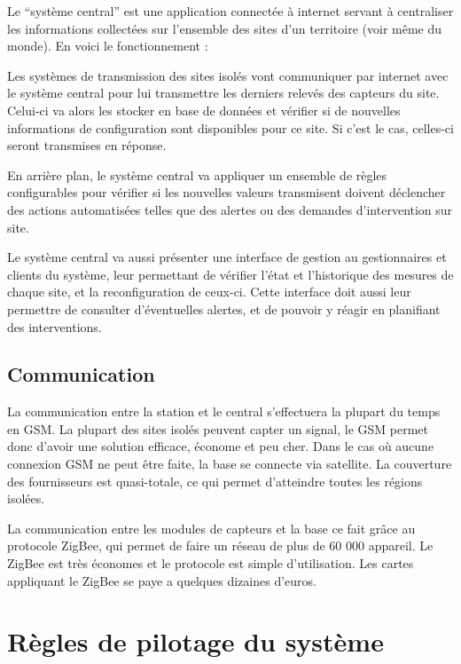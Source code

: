 Le ``système central'' est une application connectée à internet servant à centraliser les informations collectées sur l'ensemble des sites d'un territoire (voir même du monde). En voici le fonctionnement :

Les systèmes de transmission des sites isolés vont communiquer par internet avec le système central pour lui transmettre les derniers relevés des capteurs du site. Celui-ci va alors les stocker en base de données et vérifier si de nouvelles informations de configuration sont disponibles pour ce site. Si c'est le cas, celles-ci seront transmises en réponse.

En arrière plan, le système central va appliquer un ensemble de règles configurables pour vérifier si les nouvelles valeurs transmisent doivent déclencher des actions automatisées telles que des alertes ou des demandes d'intervention sur site.

Le système central va aussi présenter une interface de gestion au gestionnaires et clients du système, leur permettant de vérifier l'état et l'historique des mesures de chaque site, et la reconfiguration de ceux-ci. Cette interface doit aussi leur permettre de consulter d'éventuelles alertes, et de pouvoir y réagir en planifiant des interventions.

\subsection{Communication}

La communication entre la station et le central s’effectuera la plupart du temps en GSM. La plupart des sites isolés peuvent capter un signal, le GSM permet donc d’avoir une solution efficace, économe et peu cher. Dans le cas où aucune connexion GSM ne peut être faite, la base se connecte via satellite. La couverture des fournisseurs est quasi-totale, ce qui permet d’atteindre toutes les régions isolées. 

La communication entre les modules de capteurs et la base ce fait grâce au protocole ZigBee, qui permet de faire un réseau de plus de 60 000 appareil. Le ZigBee est très économes et le protocole est simple d’utilisation. Les cartes appliquant le ZigBee se paye a quelques dizaines d’euros. 

\section{Règles de pilotage du système}



